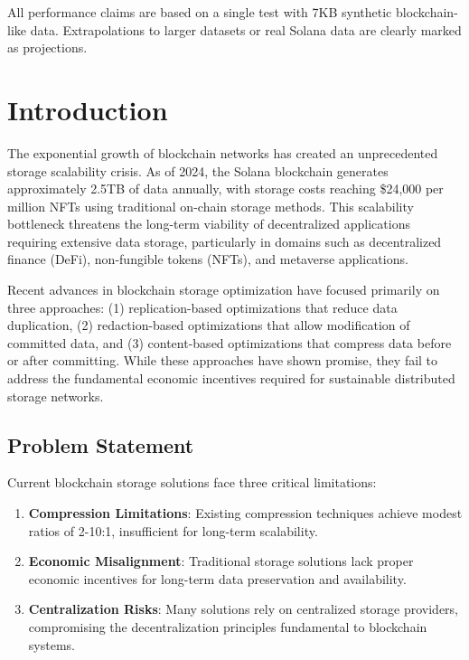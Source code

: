 \documentclass[11pt,a4paper]{article}
\begin{document}
All performance claims are based on a single test with 7KB synthetic blockchain-like data. Extrapolations to larger datasets or real Solana data are clearly marked as projections.

\section{Introduction}
\label{sec:introduction}

The exponential growth of blockchain networks has created an unprecedented storage scalability crisis. As of 2024, the Solana blockchain generates approximately 2.5TB of data annually\cite{solana_stats_2024}, with storage costs reaching \$24,000 per million NFTs using traditional on-chain storage methods\cite{solana_storage_costs}. This scalability bottleneck threatens the long-term viability of decentralized applications requiring extensive data storage, particularly in domains such as decentralized finance (DeFi), non-fungible tokens (NFTs), and metaverse applications.

Recent advances in blockchain storage optimization have focused primarily on three approaches: (1) replication-based optimizations that reduce data duplication\cite{blockchain_storage_survey_2024}, (2) redaction-based optimizations that allow modification of committed data\cite{acm_storage_optimizations}, and (3) content-based optimizations that compress data before or after committing\cite{mdpi_storage_review_2024}. While these approaches have shown promise, they fail to address the fundamental economic incentives required for sustainable distributed storage networks.

\subsection{Problem Statement}

Current blockchain storage solutions face three critical limitations:

\begin{enumerate}
\item \textbf{Compression Limitations}: Existing compression techniques achieve modest ratios of 2-10:1\cite{blockchain_compression_2024}, insufficient for long-term scalability.
\item \textbf{Economic Misalignment}: Traditional storage solutions lack proper economic incentives for long-term data preservation and availability.
\item \textbf{Centralization Risks}: Many solutions rely on centralized storage providers, compromising the decentralization principles fundamental to blockchain systems.
\end{enumerate}
\end{document}
